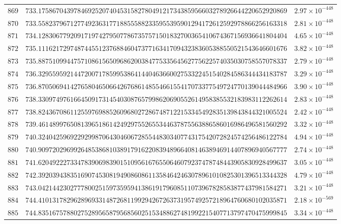 \documentclass[12pt,reqno]{amsart}
\theoremstyle{remark}
\begin{document}
\begin{longtable}{clc}
$869$ & $733.1758670439784692520740453158278049121734385956603278926644220652920869$ & $2.97\times 10^{-448}$ \\
$870$ & $733.5582379671277492363177188555882335955395901294172612592978866256163318$ & $2.81\times 10^{-448}$ \\
$871$ & $734.1283067792091719742795077867357571501832700365410674367156936641804404$ & $4.65\times 10^{-448}$ \\
$872$ & $735.1116217297487445512376884604737716341709432383605388550521543646601676$ & $3.82\times 10^{-448}$ \\
$873$ & $735.8875109944757108615650968620038477533564562775622574035030758557078337$ & $2.79\times 10^{-448}$ \\
$874$ & $736.3295595921447200717859953864144046366002753322451540284586344434183787$ & $3.29\times 10^{-448}$ \\
$875$ & $736.8705069414276580465066426768614855466155417073377549724770139044484966$ & $3.90\times 10^{-448}$ \\
$876$ & $738.3309749761664509173145403087657998620690552614958385532183983112262614$ & $2.83\times 10^{-448}$ \\
$877$ & $738.8243670861125597698852609680272867487122153345492835139843844321005524$ & $2.42\times 10^{-448}$ \\
$878$ & $739.4614899765081396518614249297552655344637875563886586016986496581560292$ & $3.32\times 10^{-448}$ \\
$879$ & $740.3240425969229299870643046067285544830340774317542072824574256486122784$ & $4.94\times 10^{-448}$ \\
$880$ & $740.9097202969926485386810389179162208394896640814638946914407896940567777$ & $2.74\times 10^{-448}$ \\
$881$ & $741.6204922273347839069839015109561676550646079237478748443905830928499637$ & $3.05\times 10^{-448}$ \\
$882$ & $742.3920394383516907453081949086086113584642463078961010825301396513344328$ & $4.79\times 10^{-448}$ \\
$883$ & $743.0421442302777800251597359594138619179608511073967828583877437981584271$ & $3.21\times 10^{-448}$ \\
$884$ & $744.4101317829628969331487268119929426726373195749257218964760680102035871$ & $2.18\times 10^{-569}$ \\
$885$ & $744.8351675788027528956587956856025153488627481992215407713797470475999845$ & $3.34\times 10^{-448}$ \\

\end{longtable}
\end{document}
